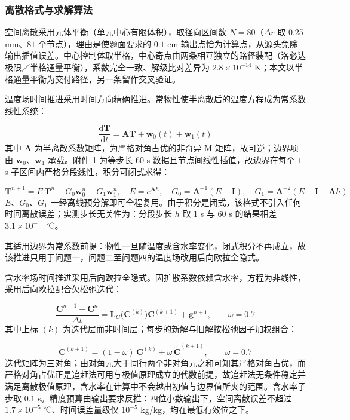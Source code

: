 \subsubsection{离散格式与求解算法}
空间离散采用元体平衡（单元中心有限体积），取径向区间数 $N=80$（$\Delta r$ 取 0.25 mm、$81$ 个节点），理由是使题面要求的 $0.1$ cm 输出点恰为计算点，从源头免除输出插值误差。中心控制体取半格，中心奇点由两条相互独立的路径装配（洛必达极限／半格通量平衡），系数完全一致、解级比对差异为 $2.8\times10^{-14}$ K；本文以半格通量平衡为交付路径，另一条留作交叉验证。

温度场时间推进采用时间方向精确推进。常物性使半离散后的温度方程成为常系数线性系统：

\begin{equation}
  \frac{\mathrm d\mathbf T}{\mathrm dt}=\mathbf A\mathbf T+\mathbf w_0(t)+\mathbf w_1(t)
  \label{eq:5-6}
\end{equation}
其中 $\mathbf A$ 为半离散系数矩阵，为严格对角占优的非奇异 M 矩阵，故可逆；边界项由 $\mathbf w_0$、$\mathbf w_1$ 承载。附件 1 为等步长 $60$ s 数据且节点间线性插值，故边界在每个 $1$ s 子区间内严格分段线性，积分可闭式求得：

\begin{equation}
  \mathbf T^{n+1}=E\,\mathbf T^{n}+G_0\mathbf w_0^{n}+G_1\mathbf w_1^{n},\quad E=e^{\mathbf A h},\quad G_0=\mathbf A^{-1}(E-\mathbf I),\quad G_1=\mathbf A^{-2}(E-\mathbf I-\mathbf A h)
  \label{eq:5-7}
\end{equation}
$E$、$G_0$、$G_1$ 一经离线预分解即可全程复用。由于积分是闭式，该格式不引入任何时间离散误差；实测步长无关性为：分段步长 $h$ 取 $1$ s 与 $60$ s 的结果相差 $3.1\times10^{-11}$ ℃。

其适用边界为常系数前提：物性一旦随温度或含水率变化，闭式积分不再成立，故该推进只用于问题一，问题二至问题四的温度场改用后向欧拉全隐式。

含水率场时间推进采用后向欧拉全隐式。因扩散系数依赖含水率，方程为非线性，采用后向欧拉配合欠松弛迭代：

\begin{equation}
  \frac{\mathbf C^{n+1}-\mathbf C^{n}}{\Delta t}=\mathbf L_C\big(\mathbf C^{(k)}\big)\mathbf C^{(k+1)}+\mathbf g^{n+1},\qquad \omega=0.7
  \label{eq:5-8}
\end{equation}
其中上标 $(k)$ 为迭代层而非时间层；每步的新解与旧解按松弛因子加权组合：

\begin{equation}
  \mathbf C^{(k+1)}=(1-\omega)\,\mathbf C^{(k)}+\omega\,\tilde{\mathbf C}^{(k+1)},\qquad \omega=0.7
  \label{eq:5-15}
\end{equation}
迭代矩阵为三对角；由对角元大于同行两个非对角元之和可知其严格对角占优，而严格对角占优正是追赶法可用与极值原理成立的代数前提，故追赶法无条件稳定并满足离散极值原理，含水率在计算中不会越出初值与边界值所夹的范围。含水率子步取 $0.1$ s。精度预算由输出要求反推：四位小数输出下，空间离散误差不超过 $1.7\times10^{-5}$ ℃、时间误差量级仅 $10^{-5}$ kg/kg，均在最低有效位之下。

